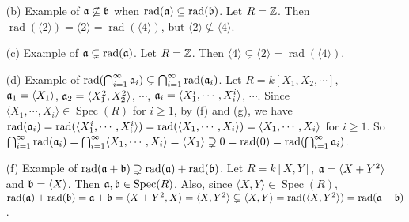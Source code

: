 \begin{example}
    \begin{enumerate}
        \item[(b)] Example of $\mathfrak{a} \not \subseteq \mathfrak{b}$ when $\operatorname{rad}(\mathfrak{a}) \subseteq \operatorname{rad}(\mathfrak{b})$. Let $R = \mathbb{Z}$. Then $\operatorname{rad}(\langle 2 \rangle) = \langle 2 \rangle = \operatorname{rad}(\langle 4 \rangle)$, but $\langle 2 \rangle \not \subseteq \langle 4 \rangle$.
        \item[(c)]
            Example of $\mathfrak{a} \subsetneq \operatorname{rad}(\mathfrak{a})$. Let $R = \mathbb{Z}$. Then $\langle 4 \rangle \subsetneq \langle 2 \rangle = \operatorname{rad}(\langle 4 \rangle)$.
        \item[(d)] Example of $\operatorname{rad}(\bigcap_{i=1}^\infty \mathfrak{a}_i) \subsetneq \bigcap_{i=1}^\infty \operatorname{rad}(\mathfrak{a}_i)$. Let $R = k[X_1,X_2,\cdots]$, $\mathfrak{a}_1 = \langle X_1 \rangle$, $\mathfrak{a}_2 = \langle X_1^2,X_2^2 \rangle$, $\cdots$, $\mathfrak{a}_i = \langle X_1^i,\cdots,X_i^i \rangle$, $\cdots$. Since $\langle X_1,\cdots,X_i \rangle \in \operatorname{Spec}(R)$ for $i \geq 1$, by (f) and (g), we have $\operatorname{rad}(\mathfrak{a}_i) = \operatorname{rad}(\langle X_1^i,\cdots,X_i^i \rangle) = \operatorname{rad}(\langle X_1,\cdots,X_i \rangle) = \langle X_1,\cdots,X_i \rangle$ for $i \geq 1$. So $\bigcap_{i=1}^\infty \operatorname{rad}(\mathfrak{a}_i) = \bigcap_{i=1}^\infty \langle X_1,\cdots,X_i \rangle = \langle X_1 \rangle \supsetneq 0 = \operatorname{rad}(0) = \operatorname{rad}(\bigcap_{i=1}^\infty \mathfrak{a}_i)$. 
        \item[(f)] Example of $\operatorname{rad}(\mathfrak{a} + \mathfrak{b}) \supsetneq \operatorname{rad}(\mathfrak{a}) + \operatorname{rad}(\mathfrak{b})$. Let $R = k[X,Y]$, $\mathfrak{a} = \langle X+Y^2 \rangle$ and $\mathfrak{b} = \langle X \rangle$. Then $\mathfrak{a},\mathfrak{b} \in \operatorname{Spec}(R)$. Also, since $\langle X,Y \rangle \in \operatorname{Spec}(R)$, $\operatorname{rad}(\mathfrak{a}) + \operatorname{rad}(\mathfrak{b}) = \mathfrak{a} + \mathfrak{b} = \langle X+Y^2,X \rangle = \langle X,Y^2 \rangle \subsetneq \langle X,Y \rangle = \operatorname{rad}(\langle X,Y^2 \rangle) = \operatorname{rad}(\mathfrak{a} + \mathfrak{b})$.
    \end{enumerate}
\end{example}

